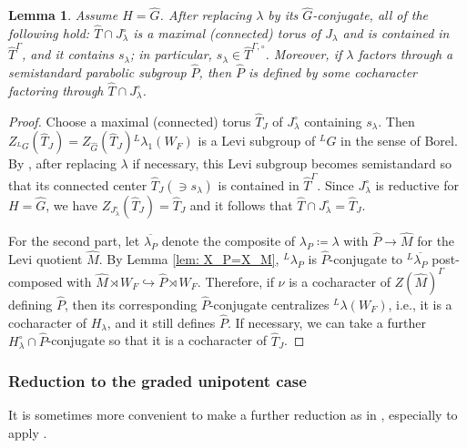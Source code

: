 \documentclass{amsart}
\newtheorem{lemma}[theorem]{Lemma}
\theoremstyle{definition}
\theoremstyle{remark}
\numberwithin{equation}{section}
\newcommand{\wh}{\widehat}
\begin{document}
\begin{lemma}\label{lem: TJcontrol}
Assume $H=\wh G$. After replacing $\lambda$ by its $\wh G$-conjugate, all of the following hold: $\wh T\cap J^{\circ}_\lambda$ is a maximal (connected) torus of $J_\lambda$ and is contained in $\wh T^\Gamma$, and it contains $s_\lambda$; in particular, $s_\lambda \in \wh T^{\Gamma, \circ}$. Moreover, if $\lambda$ factors through a semistandard parabolic subgroup $\wh P$, then $\wh P$ is defined by some cocharacter factoring through $\wh T\cap J^{\circ}_\lambda$. 
\end{lemma}

\begin{proof}
Choose a maximal (connected) torus $\wh T_J$ of $J^{\circ}_\lambda$ containing $s_\lambda$. Then $Z_{{}^L G}(\wh T_J)=Z_{\wh G}(\wh T_J){}^L \lambda_1(W_F)$ is a Levi subgroup of ${}^L G$ in the sense of Borel. By \cite[Lemma 3.5]{Bor2}, after replacing $\lambda$ if necessary, this Levi subgroup becomes semistandard so that its connected center $\wh T_J (\ni s_\lambda)$ is contained in $\wh T^\Gamma$. Since $J_\lambda^\circ$ is reductive for $H=\wh G$, we have $Z_{J_\lambda^\circ}(\wh T_J)=\wh T_J$ and it follows that $\wh T\cap J_\lambda^\circ=\wh T_J$. 

For the second part, let $\overline{\lambda_P}$ denote the composite of $\lambda_P\coloneq \lambda$ with $\wh P\to \wh M$ for the Levi quotient $\wh M$. By Lemma \ref{lem: X_P=X_M}, ${}^L \lambda_P$ is $\wh P$-conjugate to ${}^L\overline{\lambda_P}$ post-composed with $\wh M\rtimes W_F\hookrightarrow \wh P\rtimes W_F$. Therefore, if $\nu$ is a cocharacter of $Z(\wh M)^\Gamma$ defining $\wh P$, then its corresponding $\wh P$-conjugate centralizes ${}^L \lambda (W_F)$, i.e., it is a cocharacter of $H_\lambda$, and it still defines $\wh P$. If necessary, we can take a further $H_\lambda^\circ \cap \wh P$-conjugate so that it is a cocharacter of $\wh T_J$.
\end{proof}


\subsubsection{Reduction to the graded unipotent case}
It is sometimes more convenient to make a further reduction as in \cite[\S 5.4]{CFMMX}, especially to apply \cite{LusztigGraded}. 
\end{document}
